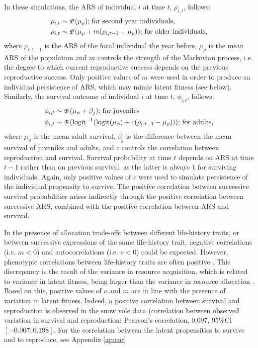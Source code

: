 In these simulations, the ARS of individual $i$ at time $t$, $\rho_{i,t}$, follows:
\begin{align*}
&\rho_{i,t} \sim \text{{\fontfamily{pzc}\selectfont P }}(\mu_{\rho}) \text{; for second year individuals,}\\ 
&\rho_{i,t} \sim \text{{\fontfamily{pzc}\selectfont P }}(\mu_{\rho}+m(\rho_{i,t-1}-\mu_{\rho}))\text{; for older individuals,}
\end{align*}
where $\rho_{i,t-1}$ is the ARS of the focal individual the year before, $\mu_{\rho}$ is the mean ARS of the population and $m$ controls the strength of the  Markovian process, i.e. the degree to which current reproductive success depends on the previous reproductive success. Only positive values of $m$ were used in order to produce an individual persistence of ARS, which may mimic latent fitness (see below).\\
Similarly, the survival outcome of individual $i$ at time $t$, $\phi_{i,t}$, follows:
\begin{align*}
&\phi_{i,t} \sim \text{{\fontfamily{pzc}\selectfont B }}(\mu_{\phi}+\beta_{j}) \text{; for juveniles}\\
&\phi_{i,t} \sim \text{{\fontfamily{pzc}\selectfont B }}(\mathrm{logit}^{-1}(\mathrm{logit}(\mu_{\phi})+c(\rho_{i,t-1}-\mu_{\rho}) ))\text{; for adults,}
\end{align*}
where $\mu_{\phi}$ is the mean adult survival, $\beta_{j}$ is the difference between the mean survival of juveniles and adults, and $c$ controls the correlation between reproduction and survival. Survival probability at time $t$ depends on ARS at time $t-1$ rather than on previous survival, as the latter is always 1 for surviving individuals. Again, only positive values of $c$ were used to simulate persistence of the individual propensity to survive. The positive correlation between successive survival probabilities arises indirectly through the positive correlation between successive ARS, combined with the positive correlation between ARS and survival.

In the presence of allocation trade-offs between different life-history traits, or between successive expressions of the same life-history trait, negative correlations (i.e. $m < 0$) and autocorrelations (i.e. $c < 0$) could be expected. However, phenotypic correlations between life-history traits are often positive \parencite[][chapter 4]{Stearns1992}. This discrepancy is the result of the variance in resource acquisition, which is related to variance in latent fitness, being larger than the variance in resource allocation \parencite{vanNoordwijk1986}. Based on this, positive values of $c$ and $m$ are in line with the presence of variation in latent fitness. Indeed, a positive correlation between survival and reproduction is observed in the snow vole data (correlation between observed variation in survival and reproduction: Pearson's correlation, 0.097, 95\%CI $[-0.007;0.198]$. For the correlation between the latent propensities to survive and to reproduce, see Appendix \ref{ap:cor}


